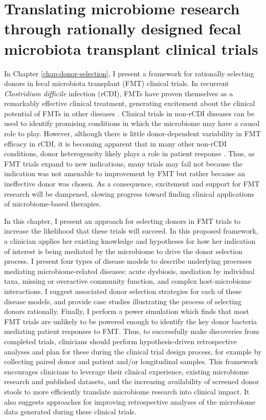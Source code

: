 \section{Translating microbiome research through rationally designed fecal microbiota transplant clinical trials}

In Chapter \ref{chap:donor-selection}, I present a framework for rationally selecting donors in fecal microbiota transplant (FMT) clinical trials.
In recurrent \textit{Clostridium difficile} infection (rCDI), FMTs have proven themselves as a remarkably effective clinical treatment, generating excitement about the clinical potential of FMTs in other diseases \cite{quraishi-2017-rcdifmt,bafeta-2017-fmt}.
Clinical trials in non-rCDI diseases can be used to identify promising conditions in which the microbiome may have a causal role to play.
However, although there is little donor-dependent variability in FMT efficacy in rCDI, it is becoming apparent that in many other non-rCDI conditions, donor heterogeneity likely plays a role in patient response \cite{moayyedi-2015,olesen-2018-superstool}.
Thus, as FMT trials expand to new indications, many trials may fail not because the indication was not amenable to improvement by FMT but rather because an ineffective donor was chosen.
As a consequence, excitement and support for FMT research will be dampened, slowing progress toward finding clinical applications of microbiome-based therapies.

In this chapter, I present an approach for selecting donors in FMT trials to increase the likelihood that these trials will succeed.
In this proposed framework, a clinician applies her existing knowledge and hypotheses for how her indication of interest is being mediated by the microbiome to drive the donor selection process.
I present four types of disease models to describe underlying processes mediating microbiome-related diseases: acute dysbiosis, mediation by individual taxa, missing or overactive community function, and complex host-microbiome interactions.
I suggest associated donor selection strategies for each of these disease models, and provide case studies illustrating the process of selecting donors rationally.
Finally, I perform a power simulation which finds that most FMT trials are unlikely to be powered enough to identify the key donor bacteria mediating patient responses to FMT.
Thus, to successfully make discoveries from completed trials, clinicians should perform hypothesis-driven retrospective analyses and plan for these during the clinical trial design process, for example by collecting paired donor and patient and/or longitudinal samples.
This framework encourages clinicians to leverage their clinical experience, existing microbiome research and published datasets, and the increasing availability of screened donor stools to more efficiently translate microbiome research into clinical impact.
It also suggests approaches for improving retrospective analyses of the microbiome data generated during these clinical trials.

